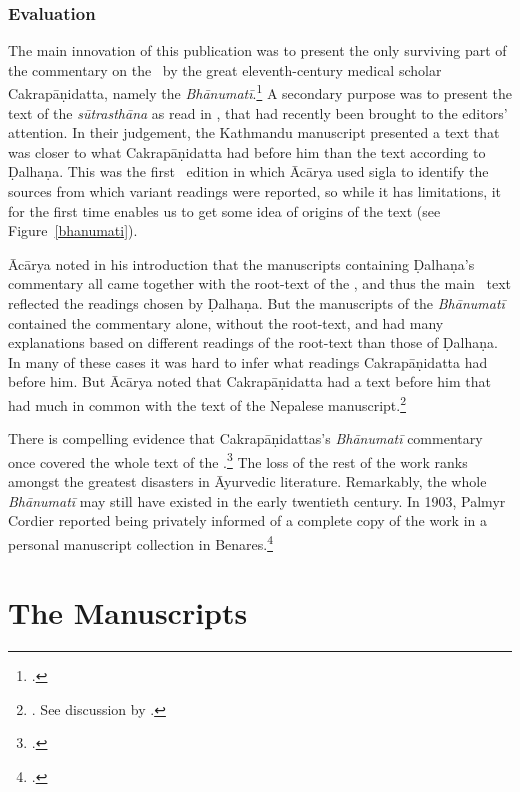 \subsubsection{Evaluation}

The main innovation of this publication was to present the only surviving part of
the commentary on the \SS\ by the great eleventh-century medical scholar
Cakrapāṇidatta, namely the \emph{Bhānumatī}.\footcite[IA, 374--375 and IB,
495--496]{meul-hist} A secondary purpose was to present the text of the
\emph{sūtrasthāna} as read in , that had recently 
been
brought to the editors' attention. In their judgement, the Kathmandu manuscript
presented a text that was closer to what Cakrapāṇidatta had before him than the
text according to Ḍalhaṇa.   This was the first \SS\ edition in which Ācārya used
sigla to identify the sources from which variant readings were reported, so while
it has limitations, it for the first time enables us to get some idea of origins
of the text (see Figure~\ref{bhanumati}).

\label{ref:dalhana}Ācārya noted in his introduction that the manuscripts containing  Ḍalhaṇa's
commentary all came together with the root-text of the \SS, and thus the main \SS\
text reflected the readings chosen by Ḍalhaṇa.  But the manuscripts of the
\emph{Bhānumatī} contained the commentary alone, without the root-text, and 
had
many explanations based on different readings of the root-text than those of
Ḍalhaṇa.  In many of these cases it was hard to infer what readings 
Cakrapāṇidatta had before him. But Ācārya noted that Cakrapāṇidatta had a text
before him that had much in common with the text of the Nepalese
manuscript.\footnote{\cite[3--4]{acar-1939}.  See discussion by
\citet[7]{kleb-2021a}.}  

There is compelling evidence that Cakrapāṇidattas's \emph{Bhānumatī} 
commentary
once covered the whole text of the \SS.\footcite[IA, 375]{meul-hist}  The loss of
the rest of the work ranks amongst the greatest disasters in Āyurvedic
literature.  Remarkably, the whole \emph{Bhānumatī} may still have existed in the
early twentieth century. In 1903, Palmyr Cordier reported being privately informed
of a complete copy of the work in a personal manuscript collection in
Benares.\footcite[332]{cord-1903}


\section{The Manuscripts}

